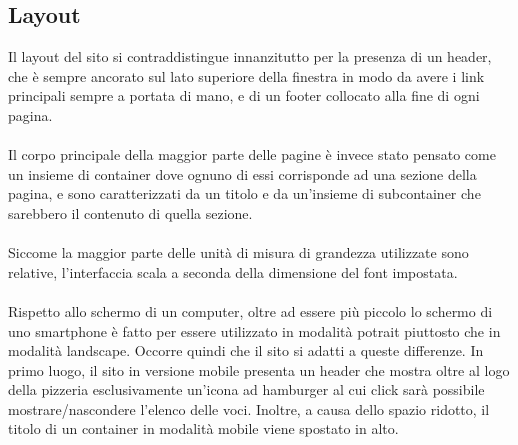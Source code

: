\subsection{Layout}
Il layout del sito si contraddistingue innanzitutto per la presenza di un header, che è sempre ancorato
sul lato superiore della finestra in modo da avere i link principali sempre a portata di mano, e di un
footer collocato alla fine di ogni pagina.\\
\\
Il corpo principale della maggior parte delle pagine è invece stato pensato come un insieme di
container dove ognuno di essi corrisponde ad una sezione della pagina, e sono caratterizzati da un titolo
e da un'insieme di subcontainer che sarebbero il contenuto di quella sezione.\\
\\
Siccome la maggior parte delle unità di misura di grandezza utilizzate sono relative, l'interfaccia scala
a seconda della dimensione del font impostata.\\
\\
Rispetto allo schermo di un computer, oltre ad essere più piccolo lo schermo di uno smartphone è
fatto per essere utilizzato in modalità potrait piuttosto che in modalità landscape. Occorre quindi che
il sito si adatti a queste differenze. In primo luogo, il sito in versione mobile presenta un header che
mostra oltre al logo della pizzeria esclusivamente un'icona ad hamburger al cui click sarà possibile
mostrare/nascondere l'elenco delle voci. Inoltre, a causa dello spazio ridotto, il titolo di un
container in modalità mobile viene spostato in alto.

\newpage
